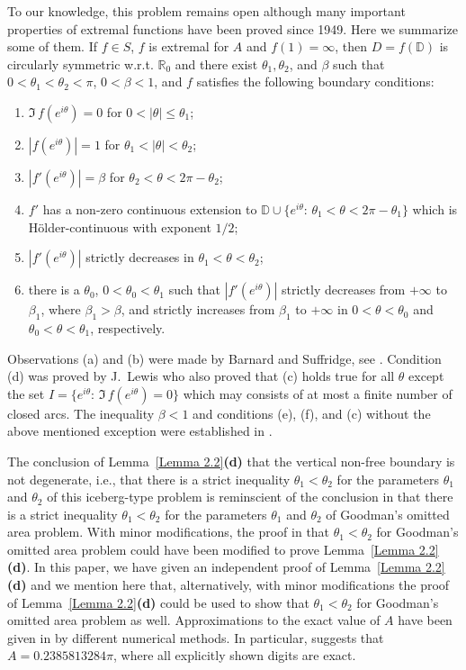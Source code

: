 \documentclass[mn,a4paper,fleqn]{w-art}
\begin{document}
{To our knowledge, this problem remains open although many
important properties of extremal functions have been proved since
1949. Here we summarize some of them. If $f\in S$, $f$ is extremal for
$A$ and $f(1)=\infty$, then $D=f(\mathbb{D})$ is circularly
symmetric w.r.t. $\mathbb{R}_0$ %
and there exist $\theta_1,\theta_2$, and $\beta$ such that
 $0<\theta_1<\theta_2<\pi$, $0<\beta<1$,
and   $f$ satisfies the following boundary conditions: %
\begin{enumerate} %
\item[(a)] $\Im\,f(e^{i\theta})=0$ for $0<|\theta|\le \theta_1$; %
\item[(b)] $|f(e^{i\theta})|=1$ for $\theta_1<|\theta|<\theta_2$; %
\item[(c)] $|f'(e^{i\theta})|=\beta$ for
$\theta_2<\theta<2\pi-\theta_2$; %
\item[(d)] $f'$ has a non-zero continuous extension to
$\mathbb{D}\cup \{e^{i\theta}:\,\theta_1<\theta<2\pi-\theta_1\}$
which is H\"{o}lder-continuous with exponent $1/2$; %
\item[(e)] $|f'(e^{i\theta})|$ strictly decreases in
$\theta_1<\theta<\theta_2$; %
\item[(f)] there is a $\theta_0$, $0<\theta_0<\theta_1$ such that
$|f'(e^{i\theta})|$ strictly decreases from $+\infty$ to $\beta_1$, where 
$\beta_1>\beta$, and strictly increases from $\beta_1$ to $+\infty$
in $0<\theta<\theta_0$ and $\theta_0<\theta<\theta_1$,
respectively. %
\end{enumerate}  %

Observations (a) and (b) were made by Barnard and Suffridge, see
\cite[p. 536]{BrC}. Condition (d) was proved by J.~Lewis \cite{L}
who also proved that (c) holds true for all $\theta$ except the
set $I=\{e^{i\theta}:\,\Im\,f(e^{i\theta})=0\}$ which may consists
of at most a finite number of closed arcs. The inequality
$\beta<1$ and conditions (e), (f), and (c) without the above
mentioned exception were established in \cite{BS}.

\smallskip

The conclusion of Lemma~\ref{Lemma 2.2}\textbf{(d)}
that the vertical non-free boundary is not degenerate, i.e., that
there is a strict inequality $\theta_1<\theta_2$  for
the parameters $\theta_1$ and $\theta_2$ of this iceberg-type problem is reminscient of the
conclusion in \cite{L} that there is a strict inequality $\theta_1<\theta_2$  for
the parameters $\theta_1$ and $\theta_2$ of Goodman's omitted
area problem.  With minor modifications, the proof in \cite{L} that
$\theta_1<\theta_2$ for Goodman's omitted area problem could have been modified to
prove Lemma~\ref{Lemma 2.2}\textbf{(d)}.  In this paper, we have given an independent
proof of Lemma~\ref{Lemma 2.2}\textbf{(d)} and we mention here that, alternatively,
with minor modifications the proof of Lemma~\ref{Lemma 2.2}\textbf{(d)} could be used
to show that $\theta_1<\theta_2$ for Goodman's omitted area problem as well.  
Approximations to the exact value of $A$ have been given in \cite{BP,BT} by 
different numerical methods.  In particular, \cite{BT} suggests that 
$A = 0.2385813284\pi$, where all explicitly shown digits are exact.

}
\end{document}
